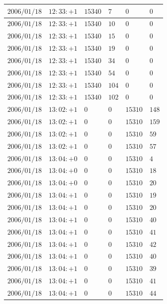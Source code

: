 \documentclass[a4j,papersize,disablejfam,slide,14pt]{jsarticle}
\begin{document}
\begin{description}
\begin{center}
\begin{longtable}{|l|l|l|l|l|l|}
					$2006/01/18$ & $12:33:+1$  & $15340$ & $7$ & $0$ & $0$ \\ \hline
					$2006/01/18$ & $12:33:+1$  & $15340$ & $10$ & $0$ & $0$ \\ \hline
					$2006/01/18$ & $12:33:+1$  & $15340$ & $15$ & $0$ & $0$ \\ \hline
					$2006/01/18$ & $12:33:+1$  & $15340$ & $19$ & $0$ & $0$ \\ \hline
					$2006/01/18$ & $12:33:+1$  & $15340$ & $34$ & $0$ & $0$ \\ \hline
					$2006/01/18$ & $12:33:+1$  & $15340$ & $54$ & $0$ & $0$ \\ \hline
					$2006/01/18$ & $12:33:+1$  & $15340$ & $104$ & $0$ & $0$ \\ \hline
					$2006/01/18$ & $12:33:+1$  & $15340$ & $102$ & $0$ & $0$ \\ \hline
					$2006/01/18$ & $13:02:+1$  & $0$ & $0$ & $15310$ & $148$ \\ \hline
					$2006/01/18$ & $13:02:+1$  & $0$ & $0$ & $15310$ & $159$ \\ \hline
					$2006/01/18$ & $13:02:+1$  & $0$ & $0$ & $15310$ & $59$ \\ \hline
					$2006/01/18$ & $13:02:+1$  & $0$ & $0$ & $15310$ & $57$ \\ \hline
					$2006/01/18$ & $13:04:+0$  & $0$ & $0$ & $15310$ & $4$ \\ \hline
					$2006/01/18$ & $13:04:+0$  & $0$ & $0$ & $15310$ & $18$ \\ \hline
					$2006/01/18$ & $13:04:+0$  & $0$ & $0$ & $15310$ & $20$ \\ \hline
					$2006/01/18$ & $13:04:+1$  & $0$ & $0$ & $15310$ & $19$ \\ \hline
					$2006/01/18$ & $13:04:+1$  & $0$ & $0$ & $15310$ & $20$ \\ \hline
					$2006/01/18$ & $13:04:+1$  & $0$ & $0$ & $15310$ & $40$ \\ \hline
					$2006/01/18$ & $13:04:+1$  & $0$ & $0$ & $15310$ & $41$ \\ \hline
					$2006/01/18$ & $13:04:+1$  & $0$ & $0$ & $15310$ & $42$ \\ \hline
					$2006/01/18$ & $13:04:+1$  & $0$ & $0$ & $15310$ & $40$ \\ \hline
					$2006/01/18$ & $13:04:+1$  & $0$ & $0$ & $15310$ & $39$ \\ \hline
					$2006/01/18$ & $13:04:+1$  & $0$ & $0$ & $15310$ & $41$ \\ \hline
					$2006/01/18$ & $13:04:+1$  & $0$ & $0$ & $15310$ & $44$ \\ \hline

\end{longtable}
\end{center}
\end{description}
\end{document}
